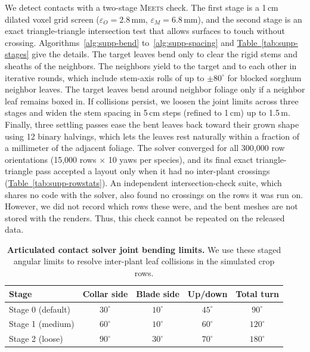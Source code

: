 \documentclass[10pt,twocolumn,letterpaper]{article}
\newcommand{\Meets}{\textsc{Meets}}
\newcommand{\tabref}[1]{\hyperref[#1]{Table~\ref*{#1}}}
\begin{document}
We detect contacts with a two-stage \Meets{} check. The first stage is a 1\,cm dilated voxel grid screen ($\varepsilon_O = 2.8$\,mm, $\varepsilon_M = 6.8$\,mm), and the second stage is an exact triangle-triangle intersection test that allows surfaces to touch without crossing. Algorithms~\ref{alg:supp-bend} to~\ref{alg:supp-spacing} and \tabref{tab:supp-stages} give the details. The target leaves bend only to clear the rigid stems and sheaths of the neighbors. The neighbors yield to the target and to each other in iterative rounds, which include stem-axis rolls of up to $\pm 80^\circ$ for blocked sorghum neighbor leaves. The target leaves bend around neighbor foliage only if a neighbor leaf remains boxed in. If collisions persist, we loosen the joint limits across three stages and widen the stem spacing in 5\,cm steps (refined to 1\,cm) up to 1.5\,m. Finally, three settling passes ease the bent leaves back toward their grown shape using 12 binary halvings, which lets the leaves rest naturally within a fraction of a millimeter of the adjacent foliage. The solver converged for all 300{,}000 row orientations (15{,}000 rows $\times$ 10 yaws per species), and its final exact triangle-triangle pass accepted a layout only when it had no inter-plant crossings (\tabref{tab:supp-rowstats}). An independent intersection-check suite, which shares no code with the solver, also found no crossings on the rows it was run on. However, we did not record which rows these were, and the bent meshes are not stored with the renders. Thus, this check cannot be repeated on the released data.

\begin{table}[t!]
  \caption{\textbf{Articulated contact solver joint bending limits.} We use these staged angular limits to resolve inter-plant leaf collisions in the simulated crop rows.}
  \label{tab:supp-stages}\label{tab:supp-solver_limits}
  \centering\scriptsize
  \setlength{\tabcolsep}{3pt}
  \begin{tabular}{lcccc}
  \toprule
  Stage & Collar side & Blade side & Up/down & Total turn \\
  \midrule
  Stage 0 (default) & $30^\circ$ & $10^\circ$ & $45^\circ$ & $90^\circ$ \\
  Stage 1 (medium)  & $60^\circ$ & $10^\circ$ & $60^\circ$ & $120^\circ$ \\
  Stage 2 (loose)   & $90^\circ$ & $30^\circ$ & $70^\circ$ & $180^\circ$ \\
  \bottomrule
  \end{tabular}
\end{table}
\end{document}
